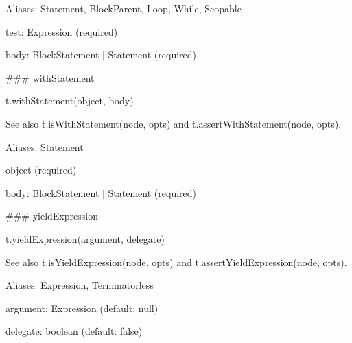 Aliases\+: {\ttfamily Statement}, {\ttfamily Block\+Parent}, {\ttfamily Loop}, {\ttfamily While}, {\ttfamily Scopable}


\begin{DoxyItemize}
\item {\ttfamily test}\+: {\ttfamily Expression} (required)
\item {\ttfamily body}\+: {\ttfamily Block\+Statement $\vert$ Statement} (required) 


\end{DoxyItemize}

\#\#\# with\+Statement 
\begin{DoxyCode}
t.withStatement(object, body)
\end{DoxyCode}


See also {\ttfamily t.\+is\+With\+Statement(node, opts)} and {\ttfamily t.\+assert\+With\+Statement(node, opts)}.

Aliases\+: {\ttfamily Statement}


\begin{DoxyItemize}
\item {\ttfamily object} (required)
\item {\ttfamily body}\+: {\ttfamily Block\+Statement $\vert$ Statement} (required) 


\end{DoxyItemize}

\#\#\# yield\+Expression 
\begin{DoxyCode}
t.yieldExpression(argument, delegate)
\end{DoxyCode}


See also {\ttfamily t.\+is\+Yield\+Expression(node, opts)} and {\ttfamily t.\+assert\+Yield\+Expression(node, opts)}.

Aliases\+: {\ttfamily Expression}, {\ttfamily Terminatorless}


\begin{DoxyItemize}
\item {\ttfamily argument}\+: {\ttfamily Expression} (default\+: {\ttfamily null})
\item {\ttfamily delegate}\+: {\ttfamily boolean} (default\+: {\ttfamily false}) 

 
\end{DoxyItemize}